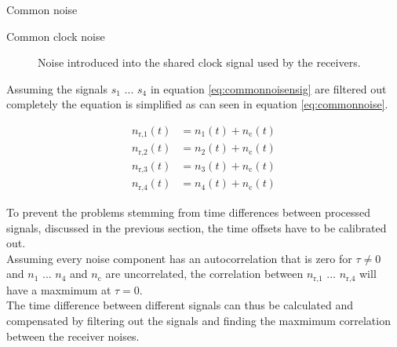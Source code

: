 \begin{subchapter}{Common noise}
\begin{description}
    \item[Common clock noise]
      Noise introduced into the shared clock signal used by the
      receivers.
  \end{description}

  Assuming the signals $s_\text{1}$ ... $s_\text{4}$ in equation
  \ref{eq:commonnoisensig} are filtered out completely the equation
  is simplified as can seen in equation \ref{eq:commonnoise}.

  \begin{align}
    \label{eq:commonnoise}
    n_\text{r,1}(t) &= n_\text{1}(t) + n_\text{c}(t) \\
    n_\text{r,2}(t) &= n_\text{2}(t) + n_\text{c}(t) \nonumber \\
    n_\text{r,3}(t) &= n_\text{3}(t) + n_\text{c}(t) \nonumber \\
    n_\text{r,4}(t) &= n_\text{4}(t) + n_\text{c}(t) \nonumber
  \end{align}

  To prevent the problems stemming from time differences between processed
  signals, discussed in the previous section, the time offsets have
  to be calibrated out. \\

  Assuming every noise component has an autocorrelation that is zero
  for $\tau \neq 0$ and $n_\text{1}$ ... $n_\text{4}$ and $n_\text{c}$
  are uncorrelated, the correlation between
  $n_\text{r,1}$ ... $n_\text{r,4}$ will have a maxmimum at $\tau = 0$. \\

  The time difference between different signals can thus be
  calculated and compensated by filtering out the signals and finding the
  maxmimum correlation between the receiver noises.
\end{subchapter}

\newpage

